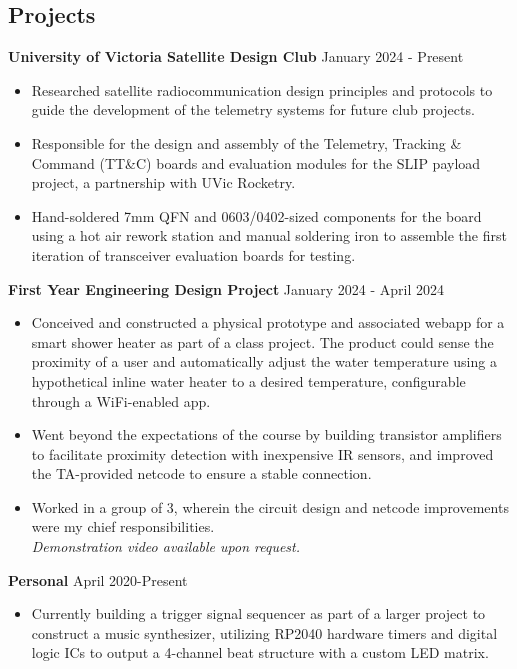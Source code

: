 \documentclass[line,margin]{res}
\begin{document}
\begin{resume}
\section{Projects} 
\textbf{University of Victoria Satellite Design Club} \hfill January 2024 - Present
\begin{itemize} \itemsep -2pt
    \item Researched satellite radiocommunication design principles and protocols to guide the development of the telemetry systems for future club projects.
    \item Responsible for the design and assembly of the Telemetry, Tracking \& Command (TT\&C) boards and evaluation modules for the SLIP payload project, a partnership with UVic Rocketry.
    \item Hand-soldered 7mm QFN and 0603/0402-sized components for the board using a hot air rework station and manual soldering iron to assemble the first iteration of transceiver evaluation boards for testing.
\end{itemize}
\textbf{First Year Engineering Design Project} \hfill January 2024 - April 2024
\begin{itemize} \itemsep -2pt
    \item Conceived and constructed a physical prototype and associated webapp for a smart shower heater as part of a class project. The product could sense the proximity of a user and automatically adjust the water temperature using a hypothetical inline water heater to a desired temperature, configurable through a WiFi-enabled app.
    \item Went beyond the expectations of the course by building transistor amplifiers to facilitate proximity detection with inexpensive IR sensors, and improved the TA-provided netcode to ensure a stable connection.
    \item Worked in a group of 3, wherein the circuit design and netcode improvements were my chief responsibilities.\\
    \textit{Demonstration video available upon request. }
\end{itemize}
\textbf{Personal} \hfill April 2020-Present
\begin{itemize} \itemsep -2pt
    \item Currently building a trigger signal sequencer as part of a larger project to construct a music synthesizer, utilizing RP2040 hardware timers and digital logic ICs to output a 4-channel beat structure with a custom LED matrix.

\end{itemize}
\end{resume}
\end{document}

